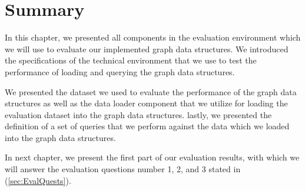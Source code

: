{\section{Summary}
\label{sec:Eval4-summary}

In this chapter, we presented all components in the evaluation environment which we will use to evaluate our implemented graph data structures. We introduced the specifications of the technical environment that we use to test the performance of loading and querying the graph data structures. 

We presented the dataset we used to evaluate the performance of the graph data structures as well as the data loader component that we utilize for loading the evaluation dataset into the graph data structures. lastly, we presented the definition of a set of queries that we perform against the data which we loaded into the graph data structures.

In next chapter, we present the first part of our evaluation results, with which we will answer the evaluation questions number 1, 2, and 3 stated in (\ref{sec:EvalQuests}).


}